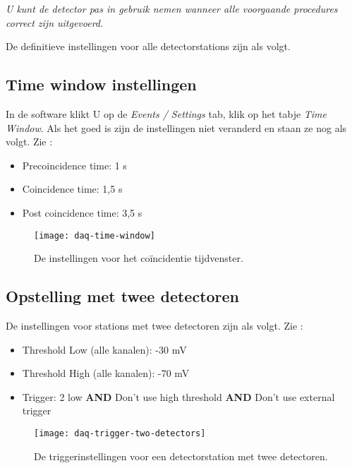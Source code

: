 \emph{U kunt de detector pas in gebruik nemen wanneer alle voorgaande procedures correct zijn uitgevoerd.}

De definitieve instellingen voor alle \hisparc detectorstations zijn als volgt.

\subsection{Time window instellingen}

In de \daq software klikt U op de \emph{Events / Settings} tab, klik op het 
tabje \emph{Time Window}. Als het goed is zijn de instellingen niet veranderd 
en staan ze nog als volgt. Zie :

\begin{itemize}
    \item Precoincidence time: 1 \micro s
    \item Coincidence time: 1,5 \micro s
    \item Post coincidence time: 3,5 \micro s
\end{itemize}

\begin{figure}
    \centering
    \texttt{[image: daq-time-window]}
    \caption{De instellingen voor het coïncidentie tijdvenster.}
    \label{fig:daq-time-window}
\end{figure}


\subsection{Opstelling met twee detectoren}

De instellingen voor stations met twee detectoren zijn als volgt. Zie
:


\begin{itemize}
    \item Threshold Low (alle kanalen): -30 mV
    \item Threshold High (alle kanalen): -70 mV
    \item Trigger: 2 low \textbf{AND} Don’t use high threshold \textbf{AND} Don’t use external trigger
\end{itemize}


\begin{figure}
    \centering
    \texttt{[image: daq-trigger-two-detectors]}
    \caption{De triggerinstellingen voor een detectorstation met twee detectoren.}
    \label{fig:daq-trigger-two-detectors}
\end{figure}


